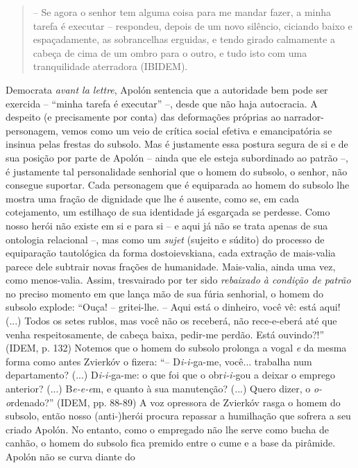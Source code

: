 \begin{quote}
-- Se agora o senhor tem alguma coisa para me mandar fazer, a minha
tarefa é executar -- respondeu, depois de um novo silêncio, ciciando
baixo e espaçadamente, as sobrancelhas erguidas, e tendo girado
calmamente a cabeça de cima de um ombro para o outro, e tudo isto com
uma tranquilidade aterradora (IBIDEM).
\end{quote}

Democrata \emph{avant la lettre}, Apolón sentencia que a autoridade bem
pode ser exercida -- ``minha tarefa é executar'' --, desde que não haja
autocracia. A despeito (e precisamente por conta) das deformações
próprias ao narrador-personagem, vemos como um veio de crítica social
efetiva e emancipatória se insinua pelas frestas do subsolo. Mas é
justamente essa postura segura de si e de sua posição por parte de
Apolón -- ainda que ele esteja subordinado ao patrão --, é justamente
tal personalidade senhorial que o homem do subsolo, o senhor, não
consegue suportar. Cada personagem que é equiparada ao homem do subsolo
lhe mostra uma fração de dignidade que lhe é ausente, como se, em cada
cotejamento, um estilhaço de sua identidade já esgarçada se perdesse.
Como nosso herói não existe em si e para si -- e aqui já não se trata
apenas de sua ontologia relacional --, mas como um \emph{sujet} (sujeito
e súdito) do processo de equiparação tautológica da forma
dostoievskiana, cada extração de mais-valia parece dele subtrair novas
frações de humanidade. Mais-valia, ainda uma vez, como menos-valia.
Assim, tresvairado por ter sido \emph{rebaixado à condição de patrão} no
preciso momento em que lança mão de sua fúria senhorial, o homem do
subsolo explode: ``Ouça! -- gritei-lhe. -- Aqui está o dinheiro, você
vê: está aqui! (...) Todos os setes rublos, mas você não os receberá,
não rece-e-eberá até que venha respeitosamente, de cabeça baixa,
pedir-me perdão. Está ouvindo?!'' (IDEM, p. 132) Notemos que o homem do
subsolo prolonga a vogal \emph{e} da mesma forma como antes Zvierkóv o
fizera: ``-- D\emph{i-i-}ga-me, você... trabalha num departamento? (...)
D\emph{i-i-}ga-me: o que foi que o obr\emph{i-i-}gou a deixar o emprego
anterior? (...) B\emph{e-e-e}m, e quanto à sua manutenção? (...) Quero
dizer, o \emph{o-o}rdenado?'' (IDEM, pp. 88-89) A voz opressora de
Zvierkóv rasga o homem do subsolo, então nosso (anti-)herói procura
repassar a humilhação que sofrera a seu criado Apolón. No entanto, como
o empregado não lhe serve como bucha de canhão, o homem do subsolo fica
premido entre o cume e a base da pirâmide. Apolón não se curva diante do
